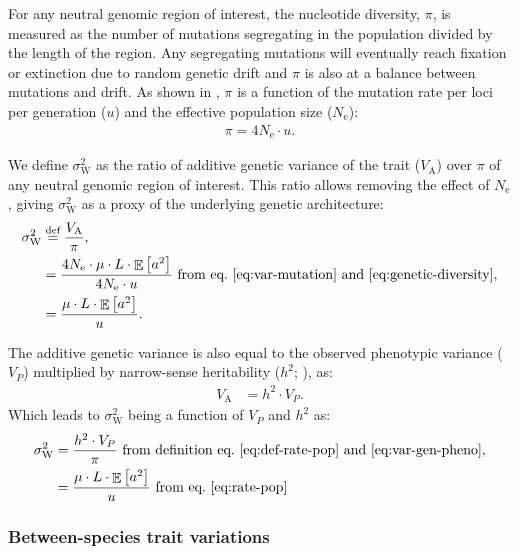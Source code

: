 \documentclass{article}
\newcommand{\defEqual}{\stackrel{\text{def}}{=}}
\newcommand{\Multiply}{\cdot}
\DeclareMathOperator{\E}{\mathbb{E}}
\newcommand{\Ne}{N_{\text{e}}}
\newcommand{\Trait}{P}
\newcommand{\Heritability}{h^2}
\newcommand{\MutationRatePheno}{\mu}
\newcommand{\MutationRateNuc}{u}
\newcommand{\NbrLoci}{L}
\newcommand{\VarPhenotype}{V_{\Trait}}
\newcommand{\VarGenetic}{V_{\mathrm{A}}}
\newcommand{\GenArchi}{\NbrLoci \Multiply \E \left[ a^2 \right]}
\newcommand{\RateWhithin}{\sigma^2_{\mathrm{W}}}
\begin{document}
For any neutral genomic region of interest, the nucleotide diversity, $\pi$, is measured as the number of mutations segregating in the population divided by the length of the region.
Any segregating mutations will eventually reach fixation or extinction due to random genetic drift and $\pi$ is also at a balance between mutations and drift.
As shown in \textcite{tajima_statistical_1989}, $\pi$ is a function of the mutation rate per loci per generation ($\MutationRateNuc$) and the effective population size ($\Ne$):
\begin{gather}
    \pi = 4 \Ne \Multiply \MutationRateNuc \label{eq:genetic-diversity}.
\end{gather}

We define $\RateWhithin$ as the ratio of additive genetic variance of the trait ($\VarGenetic$) over $\pi$ of any neutral genomic region of interest.
This ratio allows removing the effect of $\Ne$, giving $\RateWhithin$ as a proxy of the underlying genetic architecture:
\begin{align}
    \RateWhithin & \defEqual \frac{\VarGenetic }{\pi} \label{eq:def-rate-pop}, \\
    & = \frac{4 \Ne \Multiply \MutationRatePheno \Multiply \GenArchi}{4 \Ne \Multiply \MutationRateNuc} \text{ from eq.~\ref{eq:var-mutation} and~\ref{eq:genetic-diversity}}, \\
    & = \frac{\MutationRatePheno \Multiply \GenArchi}{\MutationRateNuc}. \label{eq:rate-pop}
\end{align}

The additive genetic variance is also equal to the observed phenotypic variance ($\VarPhenotype$) multiplied by narrow-sense heritability ($\Heritability$; \parencite{hill_data_2008}), as:
\begin{align}
    \VarGenetic & = \Heritability \Multiply \VarPhenotype.\label{eq:var-gen-pheno}
\end{align}
Which leads to $\RateWhithin$ being a function of $\VarPhenotype$ and $\Heritability$ as:
\begin{align}
    \RateWhithin & = \frac{\Heritability \Multiply \VarPhenotype }{\pi } \text{ from definition eq.~\ref{eq:def-rate-pop} and~\ref{eq:var-gen-pheno}}, \label{eq:def-rate-pheno-pop} \\
    & = \frac{\MutationRatePheno \Multiply \GenArchi}{\MutationRateNuc} \text{ from eq.~\ref{eq:rate-pop}} \label{eq:rate-pheno-pop}
\end{align}

\subsubsection{Between-species trait variations}
\end{document}
